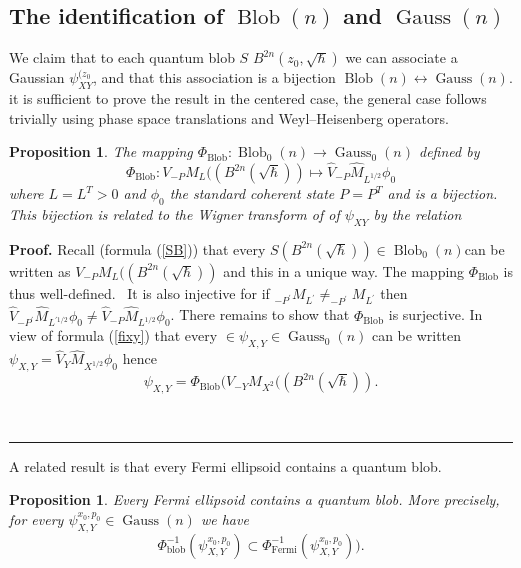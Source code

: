 \documentclass[11pt]{article}%
\newtheorem{proposition}[theorem]{Proposition}
\newenvironment{proof}[1][Proof]{\noindent\textbf{#1.} }{\ \rule{0.5em}{0.5em}}
\begin{document}
\subsection{The identification of $\operatorname*{Blob}(n)$ and
$\operatorname*{Gauss}(n)$}

We claim that to each quantum blob $S$ $B^{2n}(z_{0},\sqrt{\hbar})$ we can
associate a Gaussian $\psi_{XY}^{(z_{0}}$, and that this association is a
bijection $\operatorname*{Blob}(n)\longleftrightarrow\operatorname*{Gauss}%
(n)$. it is sufficient to prove the result in the centered case, the general
case follows trivially using phase space translations and Weyl--Heisenberg operators.

\begin{proposition}
The mapping $\Phi_{\operatorname*{Blob}}:\operatorname*{Blob}_{0}%
(n)\longrightarrow\operatorname*{Gauss}_{0}(n)$ defined by%
\[
\Phi_{\operatorname*{Blob}}:V_{-P}M_{L}((B^{2n}(\sqrt{\hbar}))\longmapsto
\widehat{V}_{-P}\widehat{M}_{L^{1/2}}\phi_{0}%
\]
where $L=L^{T}>0$ and $\phi_{0}$ the standard coherent state $P=P^{T}$ and is
a bijection. This bijection is related to the Wigner transform of of
$\psi_{XY}$ by the relation
\end{proposition}

\begin{proof}
Recall (formula (\ref{SB})) that every $S(B^{2n}(\sqrt{\hbar}))\in
\operatorname*{Blob}_{0}(n)$can be written as $V_{-P}M_{L}((B^{2n}(\sqrt
{\hbar}))$ and this in a unique way. The mapping $\Phi_{\operatorname*{Blob}}$
is thus well-defined. \ It is also injective for if $_{-P^{\prime}%
}M_{L^{\prime}}\neq_{-P^{\prime}}M_{L^{\prime}}$ then $\widehat{V}%
_{-P^{\prime}}\widehat{M}_{L^{\prime1/2}}\phi_{0}\neq\widehat{V}%
_{-P}\widehat{M}_{L^{1/2}}\phi_{0}$. There remains to show that $\Phi
_{\operatorname*{Blob}}$ is surjective. In view of formula (\ref{fixy}) that
every $\in\psi_{X,Y}\in\operatorname*{Gauss}_{0}(n)$ can be written
$\psi_{X,Y}=\widehat{V}_{Y}\widehat{M}_{X^{1/2}}\phi_{0}$ hence
\[
\psi_{X,Y}=\Phi_{\operatorname*{Blob}}(V_{-Y}M_{X^{2}}((B^{2n}(\sqrt{\hbar
})).
\]

\end{proof}

A related result is that every Fermi ellipsoid contains a quantum blob.

\begin{proposition}
\label{propinclus}Every Fermi ellipsoid contains a quantum blob. More
precisely, for every $\psi_{X,Y}^{x_{0},p_{0}}\in\operatorname*{Gauss}(n)$ we
have
\begin{equation}
\Phi_{\mathrm{blob}}^{-1}(\psi_{X,Y}^{x_{0},p_{0}})\subset\Phi
_{\mathrm{\operatorname{Fermi}}}^{-1}(\psi_{X,Y}^{x_{0},p_{0}})).
\label{inclus}%
\end{equation}

\end{proposition}
\end{document}
